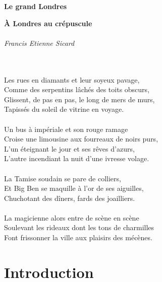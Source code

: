 \documentclass{article}
\begin{document}

\newpage
\vspace*{\fill}
\begin{flushright}\Huge{\textbf{Le grand Londres}}\end{flushright}
\vspace*{\fill}

\newpage

\vspace*{\fill}
\begin{flushleft}

\huge{\textbf{À Londres au crépuscule}}
\ \\ \ \\
\small{\textit{Francis Etienne Sicard}}

\ \\ \ \\
Les rues en diamants et leur soyeux pavage,\\
Comme des serpentins lâchés des toits obscurs,\\
Glissent, de pas en pas, le long de mers de murs,\\
Tapissés du soleil de vitrine en voyage.
\ \\ \ \\
Un bus à impériale et son rouge ramage\\
Croise une limousine aux fourreaux de noirs purs,\\
L’un éteignant le jour et ses rêves d’azurs,\\
L’autre incendiant la nuit d’une ivresse volage.
\ \\ \ \\
La Tamise soudain se pare de colliers,\\
Et Big Ben se maquille à l’or de ses aiguilles,\\
Chuchotant des dîners, fards des joailliers.
\ \\ \ \\
La magicienne alors entre de scène en scène\\
Soulevant les rideaux dont les tons de charmilles\\
Font frissonner la ville aux plaisirs des mécènes.\\
\end{flushleft}
\vspace*{5mm}


\newpage    
\tableofcontents
\newpage
\setcounter{page}{1}
\pagestyle{fancy}
\section{Introduction}
\end{document}

